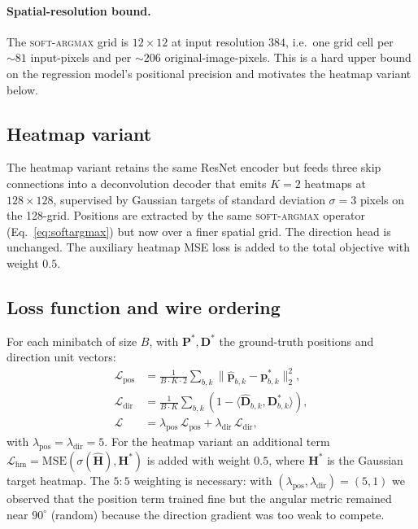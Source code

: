 \documentclass[conference,10pt,letterpaper]{IEEEtran}
\newcommand{\softargmax}{\textsc{soft-argmax}}
\begin{document}
\paragraph{Spatial-resolution bound.}
The \softargmax{} grid is $12{\times}12$ at input resolution $384$,
i.e.\ one grid cell per $\sim 81$ input-pixels and per $\sim 206$
original-image-pixels. This is a hard upper bound on the regression
model's positional precision and motivates the heatmap variant below.

\subsection{Heatmap variant}
\label{sec:heatmap}
The heatmap variant retains the same ResNet encoder but feeds three skip
connections into a deconvolution decoder that emits $K{=}2$ heatmaps at
$128{\times}128$, supervised by Gaussian targets of standard deviation
$\sigma{=}3$ pixels on the 128-grid. Positions are extracted by the same
\softargmax{} operator (Eq.~\ref{eq:softargmax}) but now over a finer
spatial grid. The direction head is unchanged. The auxiliary heatmap
MSE loss is added to the total objective with weight $0.5$.

\subsection{Loss function and wire ordering}
\label{sec:ordering}
For each minibatch of size $B$, with $\mathbf{P}^*,\mathbf{D}^*$ the
ground-truth positions and direction unit vectors:
\begin{align}
  \mathcal{L}_\text{pos} &= \frac{1}{B\cdot K\cdot 2}\sum_{b,k}\|\hat{\mathbf{p}}_{b,k}-\mathbf{p}^*_{b,k}\|_2^2, \\
  \mathcal{L}_\text{dir} &= \frac{1}{B\cdot K}\sum_{b,k}\left(1-\langle\hat{\mathbf{D}}_{b,k},\mathbf{D}^*_{b,k}\rangle\right), \\
\label{eq:loss}
  \mathcal{L}    &= \lambda_\text{pos}\,\mathcal{L}_\text{pos} + \lambda_\text{dir}\,\mathcal{L}_\text{dir},
\end{align}
with $\lambda_\text{pos}=\lambda_\text{dir}=5$. For the heatmap variant
an additional term
$\mathcal{L}_\text{hm} = \mathrm{MSE}(\sigma(\hat{\mathbf{H}}),\mathbf{H}^*)$
is added with weight $0.5$, where $\mathbf{H}^*$ is the Gaussian target
heatmap. The $5{:}5$ weighting is necessary: with $(\lambda_\text{pos},
\lambda_\text{dir})=(5,1)$ we observed that the position term trained
fine but the angular metric remained near $90^\circ$ (random) because
the direction gradient was too weak to compete.
\end{document}
